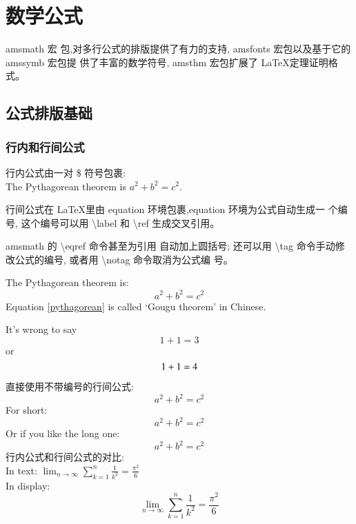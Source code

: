\documentclass[a4paper]{ctexart}
\begin{document}
    \section{数学公式}
    amsmath 宏 包,对多行公式的排版提供了有力的支持,%
    amsfonts 宏包以及基于它的 amssymb 宏包提 供了丰富的数学符号,%
    amsthm 宏包扩展了 \LaTeX 定理证明格式。\par
    \subsection{公式排版基础}
    \subsubsection{行内和行间公式}
    行内公式由一对 \$ 符号包裹:\\
    The Pythagorean theorem is %
    $a^2 + b^2 = c^2$.\par
    行间公式在 \LaTeX 里由 equation 环境包裹,equation 环境为公式自动生成一 个编号,%
    这个编号可以用 \textbackslash label 和 \textbackslash ref 生成交叉引用。\par
    amsmath 的 \textbackslash eqref 命令甚至为引用 自动加上圆括号;%
    还可以用 \textbackslash tag 命令手动修改公式的编号,%
    或者用 \textbackslash notag 命令取消为公式编 号。\par
    The Pythagorean theorem is:
    \begin{equation}
        a^2 + b^2 = c^2 \label{pythagorean}
    \end{equation}
    Equation \eqref{pythagorean} is called `Gougu theorem' in Chinese.\par
    It's wrong to say
    \begin{equation}
        1 + 1 = 3 \tag{dumb}
    \end{equation}
    or
    \begin{equation}
        1 + 1 = 4 \notag
    \end{equation}\par
    直接使用不带编号的行间公式:
    \begin{equation*}
        a^2 + b^2 = c^2
    \end{equation*}
    For short:
    \[a^2 + b^2 = c^2\]
    Or if you like the long one:
    \begin{displaymath}
        a^2 + b^2 = c^2
    \end{displaymath}
    行内公式和行间公式的对比:\\
    In text:
    $\lim_{n \to \infty} \sum_{k=1}^n \frac{1}{k^2} = \frac{\pi^2}{6}$\\
    In display:
    \[\lim_{n \to \infty} \sum_{k=1}^n \frac{1}{k^2} = \frac{\pi^2}{6}\]
\end{document}
